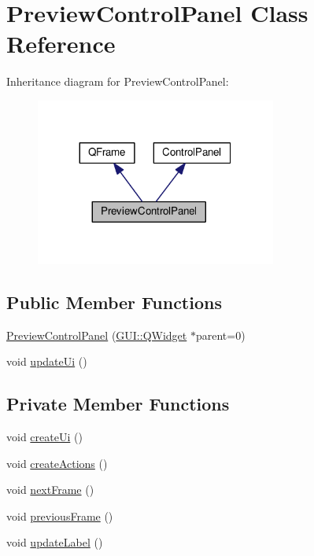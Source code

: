 \hypertarget{classGUI_1_1PreviewControlPanel}{}\section{Preview\+Control\+Panel Class Reference}
\label{classGUI_1_1PreviewControlPanel}


Inheritance diagram for Preview\+Control\+Panel\+:
\nopagebreak
\begin{figure}[H]
\begin{center}
\leavevmode
\includegraphics[width=224pt]{classGUI_1_1PreviewControlPanel__inherit__graph}
\end{center}
\end{figure}
\subsection*{Public Member Functions}
\begin{DoxyCompactItemize}
\item 
\hyperlink{classGUI_1_1PreviewControlPanel_adb0b94dcda87084c57e1f2b8fe268b73}{Preview\+Control\+Panel} (\hyperlink{classGUI_1_1QWidget}{G\+U\+I\+::\+Q\+Widget} $\ast$parent=0)
\item 
void \hyperlink{classGUI_1_1PreviewControlPanel_ae13c7f95f1ceda0fec18d18c3d7619f6}{update\+Ui} ()
\end{DoxyCompactItemize}
\subsection*{Private Member Functions}
\begin{DoxyCompactItemize}
\item 
void \hyperlink{classGUI_1_1PreviewControlPanel_aa72182c9a958af0e87b65ab7bdba0035}{create\+Ui} ()
\item 
void \hyperlink{classGUI_1_1PreviewControlPanel_a5176c9496a29e21eacb0f81ca1a29923}{create\+Actions} ()
\item 
void \hyperlink{classGUI_1_1PreviewControlPanel_a365329da56f8b07f8c95027ba967bbc3}{next\+Frame} ()
\item 
void \hyperlink{classGUI_1_1PreviewControlPanel_a3c96ed37c70ebc0b32c527a04e1536d1}{previous\+Frame} ()
\item 
void \hyperlink{classGUI_1_1PreviewControlPanel_a4b536406380edddc11ac215715dce3ea}{update\+Label} ()
\end{DoxyCompactItemize}

